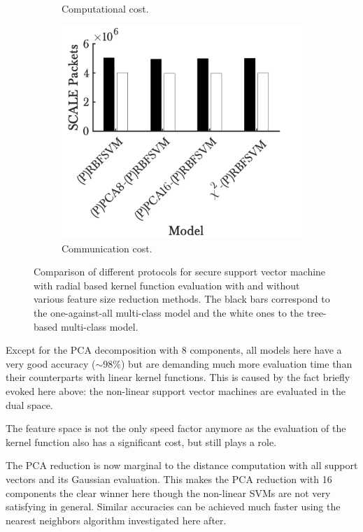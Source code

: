 \begin{figure}[h!]
\begin{subfigure}[b]{.49\textwidth}
            \caption{Computational cost.} 
        \end{subfigure}
        \hfill
        \begin{subfigure}[b]{.49\textwidth}   
            \centering 
            \includegraphics[width=.98\textwidth]{parts/chap-4/img-svm/rbfsvm-timing/comm.png}
            \caption{Communication cost.} 
        \end{subfigure}
        \caption[Comparison of the different RBFSVM models using MPC.]{Comparison of different protocols for secure support vector machine with radial based kernel function evaluation with and without various feature size reduction methods. The black bars correspond to the one-against-all multi-class model and the white ones to the tree-based multi-class model.}
        \label{fig:eval-rbfsvm}
\end{figure}

Except for the PCA decomposition with 8 components, all models here have a very good accuracy ($\sim 98\%$) but are demanding much more evaluation time than their counterparts with linear kernel functions. This is caused by the fact briefly evoked here above: the non-linear support vector machines are evaluated in the dual space.

The feature space is not the only speed factor anymore as the evaluation of the kernel function also has a significant cost, but still plays a role.

The PCA reduction is now marginal to the distance computation with all support vectors and its Gaussian evaluation. This makes the PCA reduction with 16 components the clear winner here though the non-linear SVMs are not very satisfying in general. Similar accuracies can be achieved much faster using the nearest neighbors algorithm investigated here after.

\FloatBarrier


